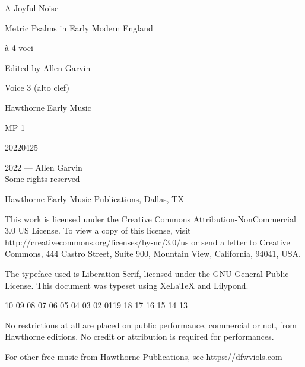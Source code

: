 \documentclass[12pt]{memoir}
\begin{document}
\pagestyle{empty}

\vspace*{\fill}

\begin{center}
\fontsize{44pt}{44pt}\selectfont
    A Joyful Noise\par
    \vspace{1in}
    Metric Psalms in Early Modern England\par
\end{center}

\begin{center}
\fontsize{24pt}{24pt}\selectfont
à 4 voci\par
    \vspace{1in}
\end{center}

\begin{center}
\fontsize{14pt}{14pt}\selectfont
Edited by Allen Garvin\par
    \vspace{1in}
\fontsize{14pt}{14pt}\selectfont
Voice 3 (alto clef)\par
\vspace*{2mm}
\end{center}

\vspace*{\fill}

\begin{center}
Hawthorne Early Music\par
MP-1\par
20220425
\end{center}

\begingroup
\footnotesize
\setlength{\parindent}{0pt}
\setlength{\parskip}{\baselineskip}
\textcopyright{}2022 --- Allen Garvin\\
Some rights reserved

Hawthorne Early Music Publications, Dallas, TX

This work is licensed under the Creative Commons Attribution-NonCommercial 3.0 US License. To view a copy of this license, visit http://creativecommons.org/licenses/by-nc/3.0/us or send a letter to Creative Commons, 444 Castro Street, Suite 900, Mountain View, California, 94041, USA.

The typeface used is Liberation Serif, licensed under the GNU General Public License. This document was typeset using XeLaTeX and Lilypond.

\begin{center}
10 09 08 07 06 05 04 03 02 01\hspace{2em}19 18 17 16 15 14 13
\end{center}

No restrictions at all are placed on public performance, commercial or not, 
from Hawthorne editions. No credit or attribution is required for 
performances.

For other free music from Hawthorne Publications, see https://dfwviols.com
\end{document}
